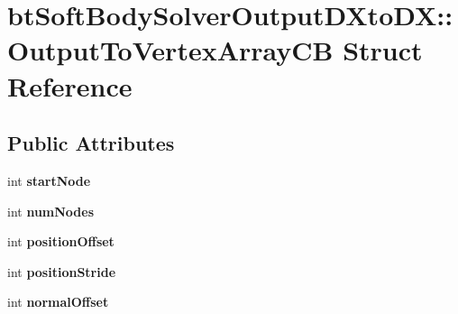 \hypertarget{structbt_soft_body_solver_output_d_xto_d_x_1_1_output_to_vertex_array_c_b}{\section{bt\+Soft\+Body\+Solver\+Output\+D\+Xto\+D\+X\+:\+:Output\+To\+Vertex\+Array\+C\+B Struct Reference}
\label{structbt_soft_body_solver_output_d_xto_d_x_1_1_output_to_vertex_array_c_b}
}
\subsection*{Public Attributes}
\begin{DoxyCompactItemize}
\item 
\hypertarget{structbt_soft_body_solver_output_d_xto_d_x_1_1_output_to_vertex_array_c_b_a5a1c3cb1be2443577f36e3a57ad6e379}{int {\bfseries start\+Node}}\label{structbt_soft_body_solver_output_d_xto_d_x_1_1_output_to_vertex_array_c_b_a5a1c3cb1be2443577f36e3a57ad6e379}

\item 
\hypertarget{structbt_soft_body_solver_output_d_xto_d_x_1_1_output_to_vertex_array_c_b_a366d01a08408bce009dd2281134ff7cc}{int {\bfseries num\+Nodes}}\label{structbt_soft_body_solver_output_d_xto_d_x_1_1_output_to_vertex_array_c_b_a366d01a08408bce009dd2281134ff7cc}

\item 
\hypertarget{structbt_soft_body_solver_output_d_xto_d_x_1_1_output_to_vertex_array_c_b_a115a80a704d1f2cb1b7b6f52ce11f7a5}{int {\bfseries position\+Offset}}\label{structbt_soft_body_solver_output_d_xto_d_x_1_1_output_to_vertex_array_c_b_a115a80a704d1f2cb1b7b6f52ce11f7a5}

\item 
\hypertarget{structbt_soft_body_solver_output_d_xto_d_x_1_1_output_to_vertex_array_c_b_af11d0d486676fdc860f0f2ad928236a7}{int {\bfseries position\+Stride}}\label{structbt_soft_body_solver_output_d_xto_d_x_1_1_output_to_vertex_array_c_b_af11d0d486676fdc860f0f2ad928236a7}

\item 
\hypertarget{structbt_soft_body_solver_output_d_xto_d_x_1_1_output_to_vertex_array_c_b_a8b80f3df0c31ece84045b90fb726456b}{int {\bfseries normal\+Offset}}\label{structbt_soft_body_solver_output_d_xto_d_x_1_1_output_to_vertex_array_c_b_a8b80f3df0c31ece84045b90fb726456b}


\end{DoxyCompactItemize}
